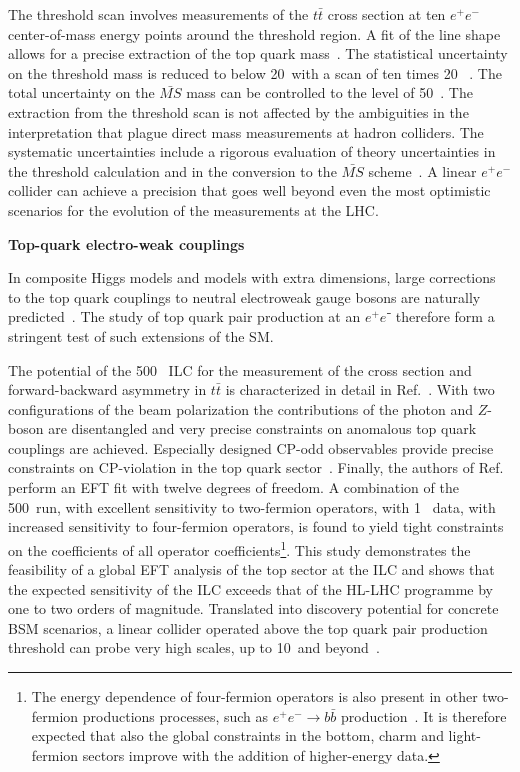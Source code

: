 The threshold scan involves measurements of the $t\bar{t}$ cross section at ten $e^+e^-$
center-of-mass energy points around the threshold region. A fit of the line shape allows for
a precise extraction of the top quark mass~\cite{Martinez:2002st,Horiguchi:2013wra,Seidel:2013sqa}.
The statistical uncertainty on the threshold mass is reduced to below 20~\MeV with a scan of
ten times 20~\invfb
. The total uncertainty on the $\bar{MS}$ mass can be controlled to the level
of 50~\MeV. The extraction from the threshold scan is not affected by the ambiguities in the
interpretation that plague direct mass measurements at hadron colliders. The systematic uncertainties
include a rigorous evaluation of theory uncertainties in the threshold calculation and in the conversion
to the $\bar{MS}$ scheme~\cite{Simon:2016pwp}. A linear $e^+e^-$collider can achieve a precision that goes well beyond
even the most optimistic scenarios for the evolution of the measurements at the LHC.


{\bf Top-quark electro-weak couplings}

In composite Higgs models and models with extra dimensions, large corrections to the top quark couplings to
neutral electroweak gauge bosons are naturally predicted~\cite{Richard:2014upa,Barducci:2015aoa,Durieux:2018ekg}.
The study of top quark pair production at an $e^+e⁻$ therefore form a stringent test of such extensions of the SM.

The potential of the 500~\GeV{} ILC for the measurement of the cross section and forward-backward asymmetry in
$t\bar{t}$ is characterized in detail in Ref.~\cite{Amjad:2015mma}. With two configurations of the beam polarization
the contributions of the photon and $Z$-boson are disentangled and very precise constraints on anomalous top quark
couplings are achieved. Especially designed CP-odd observables provide precise constraints on CP-violation in the
top quark sector~\cite{Bernreuther:2017cyi}. Finally, the authors of Ref.~\cite{Durieux:2018tev} perform an EFT fit
with twelve degrees of freedom. A combination of the 500~\GeV run, with excellent sensitivity to two-fermion operators,
with 1~\TeV{} data, with increased sensitivity to four-fermion operators, is found to yield tight constraints on the
coefficients of all operator coefficients\footnote{The energy dependence of four-fermion operators is also present in
other two-fermion productions processes, such as $e^+e^- \rightarrow b\bar{b}$ production~\cite{Bilokin:2017lco}. It is
therefore expected that also the global constraints in the bottom, charm and light-fermion sectors improve with the addition
of higher-energy data.}. This study demonstrates the feasibility of a global EFT analysis of the top sector
at the ILC and shows that the expected sensitivity of the ILC exceeds that of the HL-LHC programme by one to two orders of
magnitude. Translated into discovery potential for concrete BSM scenarios, a linear collider operated above the top quark
pair production threshold can probe very high scales, up to 10~\TeV and beyond~\cite{Durieux:2018ekg}. 

